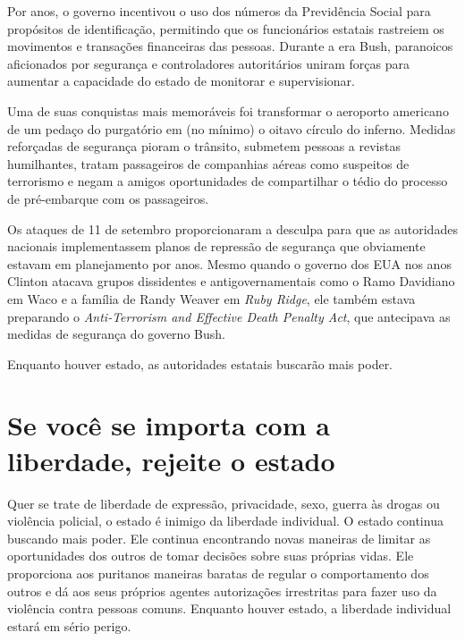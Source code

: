 Por anos, o governo incentivou o uso dos números da Previdência Social para propósitos de identificação, permitindo que os funcionários estatais rastreiem os movimentos e transações financeiras das pessoas. Durante a era Bush, paranoicos aficionados por segurança e controladores autoritários uniram forças para aumentar a capacidade do estado de monitorar e supervisionar.

Uma de suas conquistas mais memoráveis foi transformar o aeroporto americano de um pedaço do purgatório em (no mínimo) o oitavo círculo do inferno. Medidas reforçadas de segurança pioram o trânsito, submetem pessoas a revistas humilhantes, tratam passageiros de companhias aéreas como suspeitos de terrorismo e negam a amigos oportunidades de compartilhar o tédio do processo de pré-embarque com os passageiros.

Os ataques de 11 de setembro proporcionaram a desculpa para que as autoridades nacionais implementassem planos de repressão de segurança que obviamente estavam em planejamento por anos. Mesmo quando o governo dos EUA nos anos Clinton atacava grupos dissidentes e antigovernamentais como o Ramo Davidiano em Waco e a família de Randy Weaver em \emph{Ruby Ridge}, ele também estava preparando o \emph{Anti-Terrorism and Effective Death Penalty Act}, que antecipava as medidas de segurança do governo Bush.

Enquanto houver estado, as autoridades estatais buscarão mais poder.

\section{Se você se importa com a liberdade, rejeite o estado}

Quer se trate de liberdade de expressão, privacidade, sexo, guerra às drogas ou violência policial, o estado é inimigo da liberdade individual. O estado continua buscando mais poder. Ele continua encontrando novas maneiras de limitar as oportunidades dos outros de tomar decisões sobre suas próprias vidas. Ele proporciona aos puritanos maneiras baratas de regular o comportamento dos outros e dá aos seus próprios agentes autorizações irrestritas para fazer uso da violência contra pessoas comuns. Enquanto houver estado, a liberdade individual estará em sério perigo.